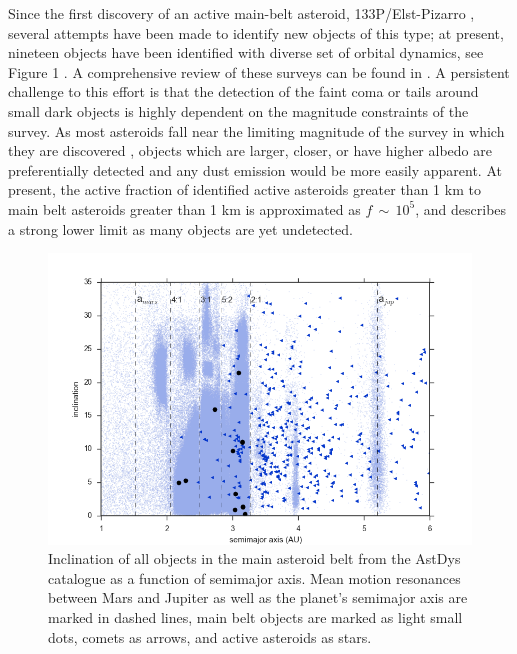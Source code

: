 \documentclass[iop,apj]{emulateapj}
\begin{document}
Since the first discovery of an active main-belt asteroid, 133P/Elst-Pizarro \citep{elst96}, several attempts have been made to identify new objects of this type; at present, nineteen objects have been identified with diverse set of orbital dynamics, see Figure 1 \citep{jewitt15, hsieh15}. A comprehensive review of these surveys can be found in \citet{hsieh15}.  A persistent challenge to this effort is that the detection of the faint coma or tails around small dark objects is highly dependent on the magnitude constraints of the survey. As most asteroids fall near the limiting magnitude of the survey in which they are discovered \citep{jewitt15}, objects which are larger, closer, or have higher albedo are preferentially detected and any dust emission would be more easily apparent. At present, the active fraction of identified active asteroids greater than 1 km to main belt asteroids greater than 1 km is approximated as $f \, \sim \, 10^5$, and describes a strong lower limit as many objects are yet undetected. \citep{jewitt15} %

\begin{figure}[!htb]
    \centering
    \includegraphics[width=\linewidth]{graphs/aa_comets_mba_all.png}
    \caption{Inclination of all objects in the main asteroid belt from the AstDys catalogue as a function of semimajor axis.  Mean motion resonances between Mars and Jupiter as well as the planet's semimajor axis are marked in dashed lines, main belt objects are marked as light small dots, comets as arrows, and active asteroids as stars.}\label{fig:1}
\end{figure}
\end{document}
